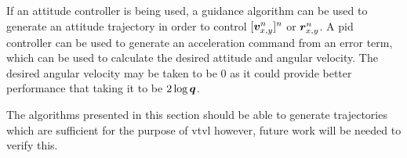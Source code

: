 If an \gls{attitude} controller is being used, a guidance algorithm can be used to generate an \gls{attitude} trajectory in order to control $[\bm v^n_{x,y}]^n$ or $\bm r^n_{x,y}$. 
A \gls{pid} controller can be used to generate an acceleration command from an error term, which can be used to calculate the desired \gls{attitude} and angular velocity. 
The desired angular velocity may be taken to be 0 as it could provide better performance that taking it to be $2 \log \bm q$.

The algorithms presented in this section should be able to generate trajectories which are sufficient for the purpose of \gls{vtvl} however, future work will be needed to verify this.